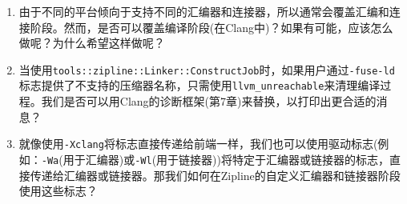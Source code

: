 \begin{enumerate}
\item 由于不同的平台倾向于支持不同的汇编器和连接器，所以通常会覆盖汇编和连接阶段。然而，是否可以覆盖编译阶段(在Clang中)？如果有可能，应该怎么做呢？为什么希望这样做呢？

\item 当使用\texttt{tools::zipline::Linker::ConstructJob}时，如果用户通过\texttt{-fuse-ld}标志提供了不支持的压缩器名称，只需使用\texttt{llvm\_unreachable}来清理编译过程。我们是否可以用Clang的诊断框架(第7章)来替换，以打印出更合适的消息？

\item 就像使用\texttt{-Xclang}将标志直接传递给前端一样，我们也可以使用驱动标志(例如：\texttt{-Wa}(用于汇编器)或\texttt{-Wl}(用于链接器))将特定于汇编器或链接器的标志，直接传递给汇编器或链接器。那我们如何在Zipline的自定义汇编器和链接器阶段使用这些标志？

\end{enumerate}